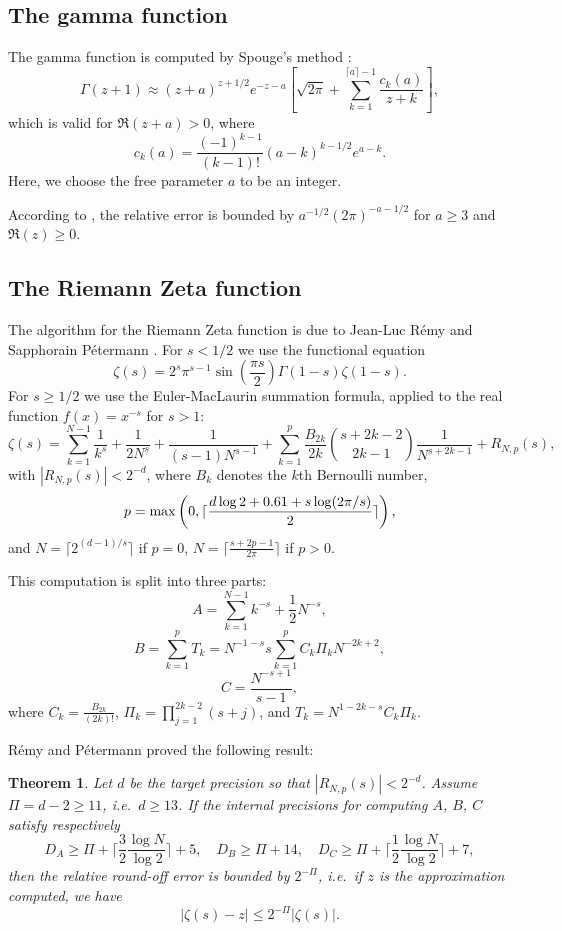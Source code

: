 \documentclass[12pt]{amsart}
\newtheorem{theorem}{Theorem}
\begin{document}
\subsection{The gamma function}


The gamma function is computed by Spouge's method \cite{Spouge94}:
\[
\Gamma(z+1) \approx (z+a)^{z+1/2} e^{-z-a} \left[ \sqrt{2 \pi} +
 \sum_{k=1}^{\lceil a \rceil - 1} \frac{c_k(a)}{z+k} \right], \]
which is valid for $\Re(z+a) > 0$, where
\[ c_k(a) = \frac{(-1)^{k-1}}{(k-1)!} (a-k)^{k-1/2} e^{a-k}. \]
Here, we choose the free parameter $a$ to be an integer.

According to \cite[Section 2.6]{Pugh04}, the relative error is bounded by
$a^{-1/2} (2\pi)^{-a-1/2}$ for $a \ge 3$ and $\Re(z) \ge 0$.

\subsection{The Riemann Zeta function}

The algorithm for the Riemann Zeta function is due to Jean-Luc R\'emy
and Sapphorain P\'etermann \cite{PeRe06}. For $s < 1/2$ we use the
functional equation
\[ \zeta(s) = 2^s \pi^{s-1} \sin\left(\frac{\pi s}{2}\right) \Gamma(1-s)
   \zeta(1-s). \]
For $s \geq 1/2$ we use the Euler-MacLaurin summation formula, applied
to the real function $f(x) = x^{-s}$ for $s > 1$:
\[ \zeta(s) = \sum_{k=1}^{N-1} \frac{1}{k^s} + \frac{1}{2N^s}
+ \frac{1}{(s-1)N^{s-1}} + \sum_{k=1}^p \frac{B_{2k}}{2k}
{s+2k-2 \choose 2k-1} \frac{1}{N^{s+2k-1}} + R_{N,p}(s), \]
with $|R_{N,p}(s)| < 2^{-d}$, where $B_k$ denotes the $k$th Bernoulli
number,
\[ p = {\rm max}\left( 0, \lceil \frac{d \log 2 + 0.61 + s \log(2\pi/s)}{2}
\rceil \right), \]
and $N = \lceil 2^{(d-1)/s} \rceil$ if $p=0$,
$N = \lceil \frac{s+2p-1}{2\pi} \rceil$ if $p > 0$.

This computation is split into three parts:
\[ A = \sum_{k=1}^{N-1} k^{-s} + \frac{1}{2} N^{-s}, \]
\[ B = \sum_{k=1}^p T_k = N^{-1-s} s \sum_{k=1}^p C_k \Pi_k N^{-2k+2}, \]
\[ C = \frac{N^{-s+1}}{s-1}, \]
where $C_k = \frac{B_{2k}}{(2k)!}$, $\Pi_k = \prod_{j=1}^{2k-2} (s+j)$,
and $T_k = N^{1-2k-s} C_k \Pi_k$.

R\'emy and P\'etermann proved the following result:
\begin{theorem}
Let $d$ be the target precision so that $|R_{N,p}(s)| < 2^{-d}$.
Assume $\Pi = d - 2 \geq 11$, i.e.\ $d \geq 13$. If the internal precisions
for computing $A$, $B$, $C$ satisfy respectively
\[ D_A \geq \Pi + \lceil \frac{3}{2} \frac{\log N}{\log 2} \rceil + 5, \quad
   D_B \geq \Pi + 14, \quad
   D_C \geq \Pi + \lceil \frac{1}{2} \frac{\log N}{\log 2} \rceil + 7, \]
then the relative round-off error is bounded by $2^{-\Pi}$, i.e.\ if $z$ is
the approximation computed, we have
\[ |\zeta(s) - z| \leq 2^{-\Pi} |\zeta(s)|. \]
\end{theorem}
\end{document}
